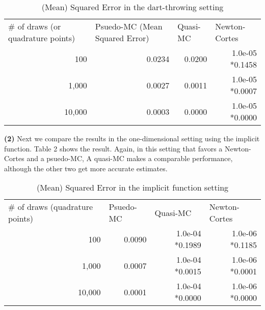 \documentclass[10pt]{article}
\renewcommand\part[1]{\vspace{.10in}\textbf{(#1)}}
\begin{document}
\begin{table}[]
\caption{(Mean) Squared Error in the dart-throwing setting}
\begin{tabular}{rrrr}
\multicolumn{1}{l}{\# of draws (or quadrature points)} & \multicolumn{1}{l}{Psuedo-MC (Mean Squared Error)} & \multicolumn{1}{l}{Quasi-MC} & \multicolumn{1}{l}{Newton-Cortes} \\
100                                                    & 0.0234                                             & 0.0200                                        & 1.0e-05 *0.1458                                   \\
1,000                                                  & 0.0027                                             & 0.0011                                        & 1.0e-05 *0.0007                                   \\
10,000                                                 & 0.0003                                             & 0.0000                                        & 1.0e-05 *0.0000                                  
\end{tabular}
\end{table}
\part{2}
Next we compare the results in the one-dimensional setting using the implicit function. Table 2 shows the result. Again, in this setting that favors a Newton-Cortes and a psuedo-MC, A quasi-MC makes a comparable performance, although the other two get more accurate estimates.
\begin{table}[]
\caption{(Mean) Squared Error in the implicit function setting}
\begin{tabular}{rrrr}
\multicolumn{1}{l}{\# of draws (quadrature points)} & \multicolumn{1}{l}{Psuedo-MC} & \multicolumn{1}{l}{Quasi-MC} & \multicolumn{1}{l}{Newton-Cortes} \\
100                                                 & 0.0090                        & 1.0e-04 *0.1989              & 1.0e-06 *0.1185                   \\
1,000                                               & 0.0007                        & 1.0e-04 *0.0015              & 1.0e-06 *0.0001                   \\
10,000                                              & 0.0001                        & 1.0e-04 *0.0000              & 1.0e-06 *0.0000                  
\end{tabular}
\end{table}
\end{document}
